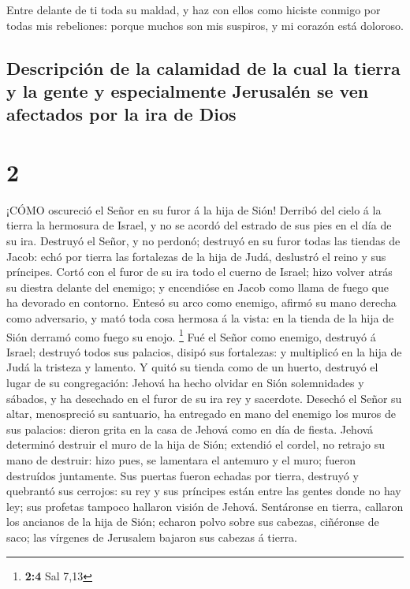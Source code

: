  Entre delante de ti toda su maldad, y haz con ellos como
hiciste conmigo por todas mis rebeliones: porque muchos son mis
suspiros, y mi corazón está doloroso.

\hypertarget{descripciuxf3n-de-la-calamidad-de-la-cual-la-tierra-y-la-gente-y-especialmente-jerusaluxe9n-se-ven-afectados-por-la-ira-de-dios}{%
\subsection{Descripción de la calamidad de la cual la tierra y la gente
y especialmente Jerusalén se ven afectados por la ira de
Dios}\label{descripciuxf3n-de-la-calamidad-de-la-cual-la-tierra-y-la-gente-y-especialmente-jerusaluxe9n-se-ven-afectados-por-la-ira-de-dios}}

\hypertarget{section-1}{%
\section{2}\label{section-1}}

 ¡CÓMO oscureció el Señor en su furor á la hija de Sión!
Derribó del cielo á la tierra la hermosura de Israel, y no se acordó del
estrado de sus pies en el día de su ira.  Destruyó el Señor,
y no perdonó; destruyó en su furor todas las tiendas de Jacob: echó por
tierra las fortalezas de la hija de Judá, deslustró el reino y sus
príncipes.  Cortó con el furor de su ira todo el cuerno de
Israel; hizo volver atrás su diestra delante del enemigo; y encendióse
en Jacob como llama de fuego que ha devorado en contorno. 
Entesó su arco como enemigo, afirmó su mano derecha como adversario, y
mató toda cosa hermosa á la vista: en la tienda de la hija de Sión
derramó como fuego su enojo. \footnote{\textbf{2:4} Sal 7,13}
 Fué el Señor como enemigo, destruyó á Israel; destruyó
todos sus palacios, disipó sus fortalezas: y multiplicó en la hija de
Judá la tristeza y lamento.  Y quitó su tienda como de un
huerto, destruyó el lugar de su congregación: Jehová ha hecho olvidar en
Sión solemnidades y sábados, y ha desechado en el furor de su ira rey y
sacerdote.  Desechó el Señor su altar, menospreció su
santuario, ha entregado en mano del enemigo los muros de sus palacios:
dieron grita en la casa de Jehová como en día de fiesta. 
Jehová determinó destruir el muro de la hija de Sión; extendió el
cordel, no retrajo su mano de destruir: hizo pues, se lamentara el
antemuro y el muro; fueron destruídos juntamente.  Sus
puertas fueron echadas por tierra, destruyó y quebrantó sus cerrojos: su
rey y sus príncipes están entre las gentes donde no hay ley; sus
profetas tampoco hallaron visión de Jehová.  Sentáronse en
tierra, callaron los ancianos de la hija de Sión; echaron polvo sobre
sus cabezas, ciñéronse de saco; las vírgenes de Jerusalem bajaron sus
cabezas á tierra.

